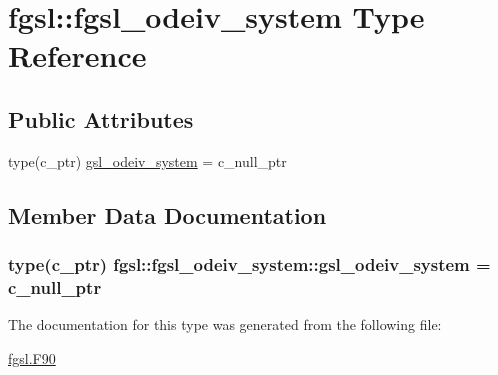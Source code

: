 \hypertarget{structfgsl_1_1fgsl__odeiv__system}{\section{fgsl\-:\-:fgsl\-\_\-odeiv\-\_\-system Type Reference}
\label{structfgsl_1_1fgsl__odeiv__system}
}
\subsection*{Public Attributes}
\begin{DoxyCompactItemize}
\item 
type(c\-\_\-ptr) \hyperlink{structfgsl_1_1fgsl__odeiv__system_a60ca24aa0fb6a166f2fd72be4c807321}{gsl\-\_\-odeiv\-\_\-system} = c\-\_\-null\-\_\-ptr
\end{DoxyCompactItemize}


\subsection{Member Data Documentation}
\hypertarget{structfgsl_1_1fgsl__odeiv__system_a60ca24aa0fb6a166f2fd72be4c807321}{
\subsubsection[{gsl\-\_\-odeiv\-\_\-system}]{\setlength{\rightskip}{0pt plus 5cm}type(c\-\_\-ptr) fgsl\-::fgsl\-\_\-odeiv\-\_\-system\-::gsl\-\_\-odeiv\-\_\-system = c\-\_\-null\-\_\-ptr}}\label{structfgsl_1_1fgsl__odeiv__system_a60ca24aa0fb6a166f2fd72be4c807321}


The documentation for this type was generated from the following file\-:\begin{DoxyCompactItemize}
\item 
\hyperlink{fgsl_8F90}{fgsl.\-F90}\end{DoxyCompactItemize}
